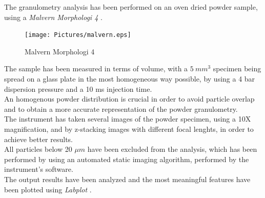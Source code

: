 \documentclass{article}
\begin{document}
    The granulometry analysis has been performed on an oven dried powder sample, 
    using a \textit{Malvern Morphologi 4} \autocites{Malvern_Morphologi4}. \\ 

    \begin{figure}[h!]
        \centering
        \texttt{[image: Pictures/malvern.eps]}
        \caption{Malvern Morphologi 4 \autocites{Malvern_Morphologi4}}
        \label{fig:morphologi4}
    \end{figure}

    The sample has been measured in terms of volume, with a $5 \ mm^3$ specimen being spread on a glass plate in the 
    most homogeneous way possible, by using a 4 bar dispersion pressure and a 10 ms injection time. \\ 

    An homogenous powder distribution is crucial in order to avoid particle overlap and to obtain a more accurate 
    representation of the powder granulometry. \\ 

    The instrument has taken several images of the powder specimen, using a 10X magnification, and by z-stacking 
    images with different focal lenghts, in order to achieve better results. \\

    All particles below 20 $\mu m$ have been excluded from the analysis, which has been performed by using an automated 
    static imaging algorithm, performed by the instrument's software. \\ 

    The output results have been analyzed and the most meaningful features have been plotted using \textit{Labplot} \autocites{Labplot}. \\ 
\end{document}
